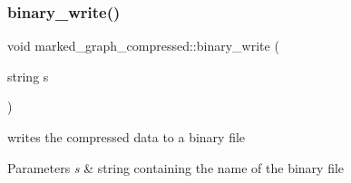 \mbox{\label{classmarked__graph__compressed_a13ab09e4b399f179ec91746ae2b8b38c}} 
\subsubsection{\texorpdfstring{binary\+\_\+write()}{binary\_write()}\hspace{0.1cm}{\footnotesize\ttfamily [2/2]}}
{\footnotesize\ttfamily void marked\+\_\+graph\+\_\+compressed\+::binary\+\_\+write (\begin{DoxyParamCaption}\item[{string}]{s }\end{DoxyParamCaption})}

writes the compressed data to a binary file 
\begin{DoxyParams}{Parameters}
{\em s} & string containing the name of the binary file \\
\hline
\end{DoxyParams}

